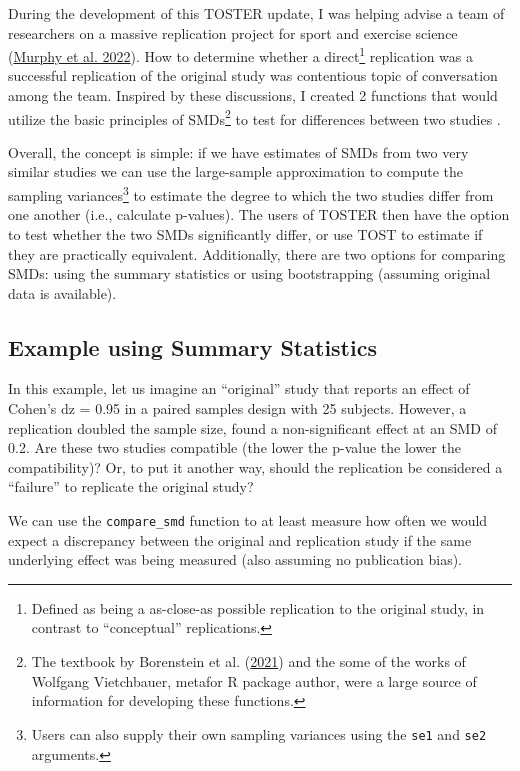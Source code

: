 \documentclass[
]{interact}
\begin{document}
During the development of this TOSTER update, I was helping advise a
team of researchers on a massive replication project for sport and
exercise science (\protect\hyperlink{ref-repSES}{Murphy et al. 2022}).
How to determine whether a direct\footnote{Defined as being a
  as-close-as possible replication to the original study, in contrast to
  ``conceptual'' replications.} replication was a successful replication
of the original study was contentious topic of conversation among the
team. Inspired by these discussions, I created 2 functions that would
utilize the basic principles of SMDs\footnote{The textbook by Borenstein
  et al. (\protect\hyperlink{ref-borenstein}{2021}) and the some of the
  works of Wolfgang Vietchbauer, metafor R package author, were a large
  source of information for developing these functions.} to test for
differences between two studies .

Overall, the concept is simple: if we have estimates of SMDs from two
very similar studies we can use the large-sample approximation to
compute the sampling variances\footnote{Users can also supply their own
  sampling variances using the \texttt{se1} and \texttt{se2} arguments.}
to estimate the degree to which the two studies differ from one another
(i.e., calculate p-values). The users of TOSTER then have the option to
test whether the two SMDs significantly differ, or use TOST to estimate
if they are practically equivalent. Additionally, there are two options
for comparing SMDs: using the summary statistics or using bootstrapping
(assuming original data is available).

\hypertarget{example-using-summary-statistics}{%
\subsection{Example using Summary
Statistics}\label{example-using-summary-statistics}}

In this example, let us imagine an ``original'' study that reports an
effect of Cohen's dz = 0.95 in a paired samples design with 25 subjects.
However, a replication doubled the sample size, found a non-significant
effect at an SMD of 0.2. Are these two studies compatible (the lower the
p-value the lower the compatibility)? Or, to put it another way, should
the replication be considered a ``failure'' to replicate the original
study?

We can use the \texttt{compare\_smd} function to at least measure how
often we would expect a discrepancy between the original and replication
study if the same underlying effect was being measured (also assuming no
publication bias).
\end{document}
